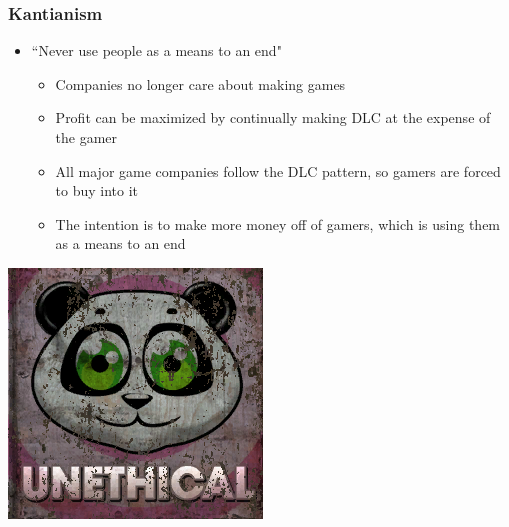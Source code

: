 \documentclass{beamer}
\begin{document}
\begin{frame}
\frametitle{Kantianism}
\begin{itemize}
\item ``Never use people as a means to an end"
\pause
\begin{itemize}
\item Companies no longer care about making games
\pause
\item Profit can be maximized by continually making DLC at the expense of the gamer
\pause
\item All major game companies follow the DLC pattern, so gamers are forced to buy into it
\pause
\item The intention is to make more money off of gamers, which is using them as a means to an end
\pause
\end{itemize}
\end{itemize}
\begin{center}
\includegraphics[scale=0.3]{unethical}
\end{center}
\end{frame}
\end{document}
